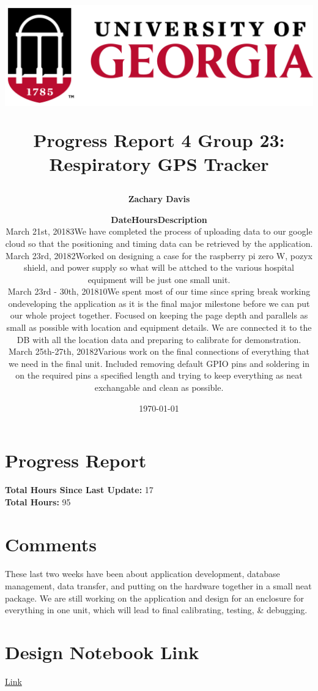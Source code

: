 \documentclass[11pt]{report}
\title{
	\begin{center}
		\includegraphics[scale=0.5]{uga.PNG}\\
 	\end{center}
 	Progress Report 4
\bigbreak Group 23: Respiratory GPS Tracker
}
\author{\textbf{Zachary Davis}}
\date{\today}
\begin{document}
\maketitle

\section*{Progress Report}
	\begin{center}
		\author{
		{\normalsize
		\begin{tabular}{m{4cm} m{2cm} m{10cm}}
		\textbf{Date} & \textbf{Hours} & \textbf{Description}\\
		\hline
		March 21st, 2018 & $3$ & We have completed the process of uploading data to our google cloud so that the positioning and timing data can be retrieved by the application.\\
		March 23rd, 2018 & $2$ & Worked on designing a case for the raspberry pi zero W, pozyx shield, and power supply so what will be attched to the various hospital equipment will be just one small unit.\\
		March 23rd - 30th, 2018 & $10$ & We spent most of our time since spring break working on\/developing the application as it is the final major milestone before we can put our whole project together. Focused on keeping the page depth and parallels as small as possible with location and equipment details. We are connected it to the DB with all the location data and preparing to calibrate for demonstration.\\
		March 25th-27th, 2018 & $2$ & Various work on the final connections of everything that we need in the final unit. Included removing default GPIO pins and soldering in on the required pins a specified length and trying to keep everything as neat exchangable and clean as possible.\\
		\end{tabular}
		}
		}
	\end{center}
		\textbf{Total Hours Since Last Update: } 17\\
		\textbf{Total Hours: } 95

\section*{Comments}
	\paragraph*{}
		These last two weeks have been about application development, database management, data transfer, and putting on the hardware together in a small neat package. We are still working on the application and design for an enclosure for everything in one unit, which will lead to final calibrating, testing, \& debugging.

\section*{Design Notebook Link}
	\begin{center}
		\href{https://docs.google.com/document/d/1_15R62LK1jZ8SYRuCrb-5IObISIdbLSfoH2bRU7464c/edit?usp=sharing}{Link}
	\end{center}
\end{document}
